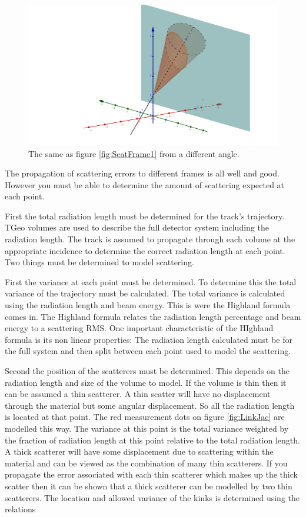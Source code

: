 \begin{figure}[H]
\centering
\includegraphics[width=1.0\linewidth]{figures/prop600GoodOffSensor.png}
\caption{The same as figure \ref{fig:ScatFrame1} from a different angle.}
\label{fig:ScatFrame2}
\end{figure}

The propagation of scattering errors to different frames is all well and good. However you must be able to determine the amount of scattering expected at each point.

First the total radiation length must be determined for the track's trajectory. TGeo volumes are used to describe the full detector system including the radiation length. The track is assumed to propagate through each volume at the appropriate incidence to determine the correct radiation length at each point. Two things must be determined to model scattering.

First the variance at each point must be determined. To determine this the total variance of the trajectory must be calculated. The total variance is calculated using the radiation length and beam energy. This is were the Highland formula comes in. The Highland formula relates the radiation length percentage and beam energy to a scattering RMS. One important characteristic of the HIghland formula is its non linear properties: The radiation length calculated must be for the full system and then split between each point used to model the scattering. 

Second the position of the scatterers must be determined. This depends on the radiation length and size of the volume to model. If the volume is thin then it can be assumed a thin scatterer. A thin scatter will have no displacement through the material but some angular displacement. So all the radiation length is located at that point. The red measurement dots on figure \ref{fig:LinkJac} are modelled this way. The variance at this point is the total variance weighted by the fraction of radiation length at this point relative to the total radiation length.
A thick scatterer will have some displacement due to scattering within the material and can be viewed as the combination of many thin scatterers. If you propagate the error associated with each thin scatterer which makes up the thick scatter then it can be shown that a thick scatterer can be modelled by two thin scatterers. The location and allowed variance of the kinks is determined using the relations

